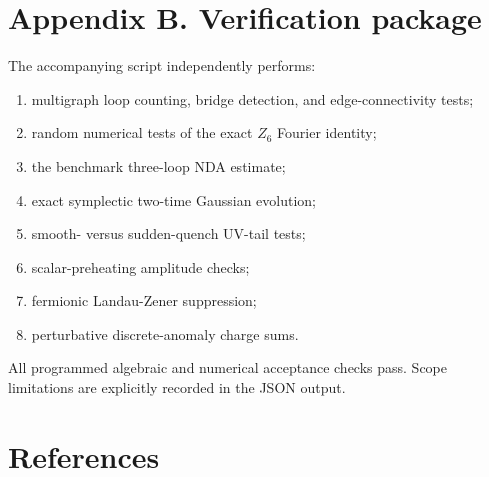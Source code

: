 \documentclass[
  10pt,
]{article}
\providecommand{\tightlist}{%
  \setlength{\itemsep}{0pt}\setlength{\parskip}{0pt}}
\begin{document}
\section{Appendix B. Verification
package}\label{appendix-b.-verification-package}

The accompanying script independently performs:

\begin{enumerate}
\def\labelenumi{\arabic{enumi}.}
\tightlist
\item
  multigraph loop counting, bridge detection, and edge-connectivity
  tests;
\item
  random numerical tests of the exact \(Z_6\) Fourier identity;
\item
  the benchmark three-loop NDA estimate;
\item
  exact symplectic two-time Gaussian evolution;
\item
  smooth- versus sudden-quench UV-tail tests;
\item
  scalar-preheating amplitude checks;
\item
  fermionic Landau-Zener suppression;
\item
  perturbative discrete-anomaly charge sums.
\end{enumerate}

All programmed algebraic and numerical acceptance checks pass. Scope
limitations are explicitly recorded in the JSON output.

\section{References}\label{references}
\end{document}
